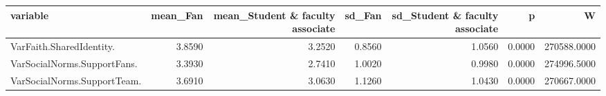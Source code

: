 \begin{tabular}{lrrrrrr}
  \hline
variable & mean\_Fan & mean\_Student \& faculty associate & sd\_Fan & sd\_Student \& faculty associate & p & W \\ 
  \hline
VarFaith.SharedIdentity. & 3.8590 & 3.2520 & 0.8560 & 1.0560 & 0.0000 & 270588.0000 \\ 
  VarSocialNorms.SupportFans. & 3.3930 & 2.7410 & 1.0020 & 0.9980 & 0.0000 & 274996.5000 \\ 
  VarSocialNorms.SupportTeam. & 3.6910 & 3.0630 & 1.1260 & 1.0430 & 0.0000 & 270667.0000 \\ 
   \hline
\end{tabular}
